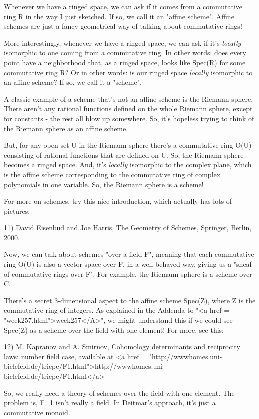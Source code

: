 Whenever we have a ringed space, we can ask if it comes from a
commutative ring R in the way I just sketched.  If so, we call it an
"affine scheme".  Affine schemes are just a fancy
geometrical way of talking about commutative rings!

More interestingly, whenever we have a ringed space, we can ask if
it's \emph{locally} isomorphic to one coming from a commutative ring.  
In other words: does every point have a neighborhood that, as a
ringed space, looks like Spec(R) for some commutative ring R?
Or in other words: is our ringed space \emph{locally} isomorphic to an
affine scheme?  If so, we call it a "scheme".  

A classic example of a scheme that's not an affine scheme is the
Riemann sphere.  There aren't any rational functions defined on the
whole Riemann sphere, except for constants - the rest all blow up 
somewhere.  So, it's hopeless trying to think of the Riemann sphere
as an affine scheme.

But, for any open set U in the Riemann sphere there's a commutative
ring O(U) consisting of rational functions that are defined on U.  So,
the Riemann sphere becomes a ringed space.  And, it's \emph{locally}
isomorphic to the complex plane, which is the affine scheme
corresponding to the commutative ring of complex polynomials in one
variable.  So, the Riemann sphere is a scheme!

For more on schemes, try this nice introduction, which actually
has lots of pictures:

11) David Eisenbud and Joe Harris, 
The Geometry of Schemes, Springer, Berlin, 2000.

Now, we can talk about schemes "over a field F", meaning
that each commutative ring O(U) is also a vector space over F, in a
well-behaved way, giving us a "sheaf of commutative rings over
F".  For example, the Riemann sphere is a scheme over C.

There's a secret 3-dimensional aspect to the affine scheme Spec(Z),
where Z is the commutative ring of integers.  As explained in the
Addenda to "<a href = "week257.html">week257</A>", we might
understand this if we could see Spec(Z) as a scheme over the field
with one element!  For more, see this:

12) M. Kapranov and A. Smirnov, Cohomology determinants and 
reciprocity laws: number field case, available at 
<a href = "http://wwwhomes.uni-bielefeld.de/triepe/F1.html">http://wwwhomes.uni-bielefeld.de/triepe/F1.html</a>

So, we really need a theory of schemes over the field with one
element.  The problem is, F_{1} isn't really a field.  In
Deitmar's approach, it's just a commutative monoid.

